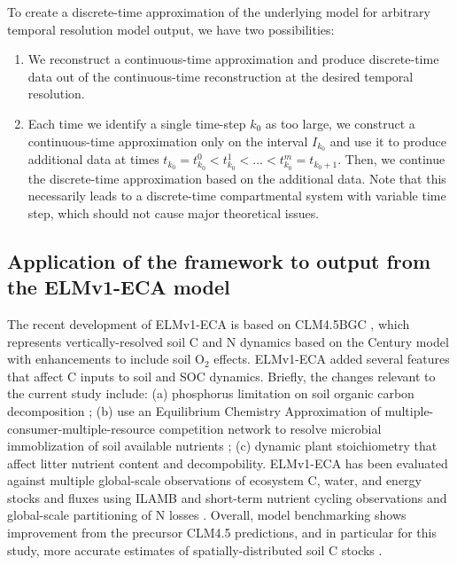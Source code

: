 \documentclass[11pt,a4paper]{article}
\begin{document}
    To  create a discrete-time approximation of the underlying model for arbitrary temporal resolution model output, we have two possibilities:
    \begin{enumerate}[(1)]
        \item We reconstruct a continuous-time approximation and produce discrete-time data out of the continuous-time reconstruction at the desired temporal resolution.
        \item Each time we identify a single time-step $k_0$ as too large, we construct a continuous-time approximation only on the interval $I_{k_0}$ and use it to produce additional data at times $t_{k_0}=t_{k_0}^0<t_{k_0}^1<\ldots<t_{k_0}^m=t_{k_0+1}$.
        Then, we continue the discrete-time approximation based on the additional data.
        Note that this necessarily leads to a discrete-time compartmental system with variable time step, which should not cause major theoretical issues.
    \end{enumerate}


\subsection{Application of the framework to output from the ELMv1-ECA model}
    
    The recent development of ELMv1-ECA \citep{Zhu2019} is based on CLM4.5BGC \citep{Koven2013}, which represents vertically-resolved soil C and N dynamics based on the Century model \citep{Parton1993} with enhancements  to include soil O$_2$ effects. ELMv1-ECA added several features that affect C inputs to soil and SOC dynamics. Briefly, the changes relevant to the current study include: (a) phosphorus limitation on soil organic carbon decomposition \citep{zhu2016bg}; (b) use an Equilibrium Chemistry Approximation of multiple-consumer-multiple-resource competition network to resolve microbial immoblization of soil available nutrients \citep{Tang2013, Zhu2017ea} ; (c) dynamic plant stoichiometry that affect litter nutrient content and decompobility. ELMv1-ECA has been evaluated against multiple global-scale observations of ecosystem C, water, and energy stocks and fluxes using ILAMB \citep{Collier2018, Zhu2019} and short-term nutrient cycling observations and global-scale partitioning of N losses \citep{Zhu2015ncc, Riley2018}. Overall, model benchmarking shows improvement from the precursor CLM4.5 predictions, and in particular for this study, more accurate estimates of spatially-distributed soil C stocks \citep{Zhu2019}.
    
\end{document}
